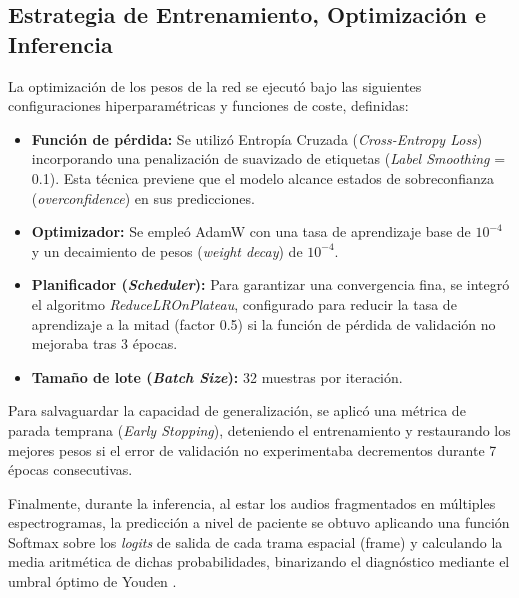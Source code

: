 \subsection{Estrategia de Entrenamiento, Optimización e Inferencia}
La optimización de los pesos de la red se ejecutó bajo las siguientes configuraciones hiperparamétricas y funciones de coste, definidas:

\begin{itemize}
    \item \textbf{Función de pérdida:} Se utilizó Entropía Cruzada (\textit{Cross-Entropy Loss}) incorporando una penalización de suavizado de etiquetas (\textit{Label Smoothing} = 0.1). Esta técnica previene que el modelo alcance estados de sobreconfianza (\textit{overconfidence}) en sus predicciones.
    \item \textbf{Optimizador:} Se empleó AdamW con una tasa de aprendizaje base de $10^{-4}$ y un decaimiento de pesos (\textit{weight decay}) de $10^{-4}$.
    \item \textbf{Planificador (\textit{Scheduler}):} Para garantizar una convergencia fina, se integró el algoritmo \textit{ReduceLROnPlateau}, configurado para reducir la tasa de aprendizaje a la mitad (factor 0.5) si la función de pérdida de validación no mejoraba tras 3 épocas.
    \item \textbf{Tamaño de lote (\textit{Batch Size}):} 32 muestras por iteración.
\end{itemize}

Para salvaguardar la capacidad de generalización, se aplicó una métrica de parada temprana (\textit{Early Stopping}), deteniendo el entrenamiento y restaurando los mejores pesos si el error de validación no experimentaba decrementos durante 7 épocas consecutivas. 

Finalmente, durante la inferencia, al estar los audios fragmentados en múltiples espectrogramas, la predicción a nivel de paciente se obtuvo aplicando una función Softmax sobre los \textit{logits} de salida de cada trama espacial (frame) y calculando la media aritmética de dichas probabilidades, binarizando el diagnóstico mediante el umbral óptimo de Youden \cite{youden1950}.